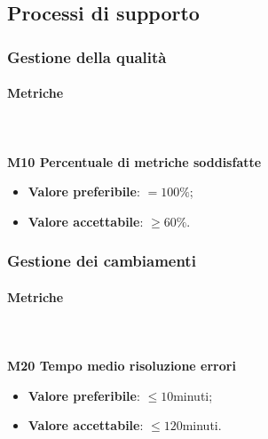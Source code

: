 			
	\subsection{Processi di supporto}		
		\subsubsection{Gestione della qualità}
			\paragraph{Metriche} \mbox{} \\ \\
				\textbf{M10 Percentuale di metriche soddisfatte}
				\begin{itemize}
					\item \textbf{Valore preferibile}: $= 100\%$;
					\item \textbf{Valore accettabile}: $\ge 60\%$.
				\end{itemize}
			
		\subsubsection{Gestione dei cambiamenti}
		 	\paragraph{Metriche} \mbox{} \\ \\
		 	\textbf{M20 Tempo medio risoluzione errori}
			\begin{itemize}
				\item \textbf{Valore preferibile}: $\le 10$minuti;
				\item \textbf{Valore accettabile}: $\le 120$minuti.
			\end{itemize}

		  
			
				

